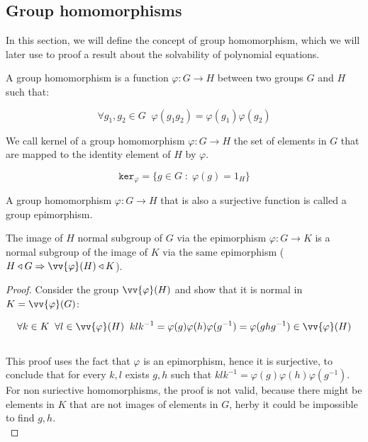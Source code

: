 \subsection{Group homomorphisms}
In this section, we will define the concept of group homomorphism, which we 
will later use to proof a result about the solvability of polynomial equations.  

\begin{definition}
    A group homomorphism is a function $\varphi: G \to H$ between 
    two groups $G$ and $H$ such that:
    
    $$ \forall g_1, g_2 \in G\;\; \varphi(g_1g_2) = \varphi(g_1)\varphi(g_2) $$
\end{definition} \vspace{0.2em}

\begin{definition}[Kernel]
    We call kernel of a group homomorphism $\varphi: G \to H$ the set of
    elements in $G$ that are mapped to the identity element of $H$ by $\varphi$.

    $$ \texttt{ker}_{\varphi} = \{ g \in G \;:\; \varphi(g) = 1_H \}$$
\end{definition} \vspace{0.2em}

\begin{definition}
    A group homomorphism $\varphi: G \to H$ that is also a surjective 
    function is called a group epimorphism.
\end{definition} \vspace{0.2em}

\begin{lemma}
\label{lem:epimorphismPreservesNormality}
    The image of $H$ normal subgroup of $G$ via the epimorphism $\varphi: G \to K$
    is a normal subgroup of the image of $K$ via the same epimorphism 
    ($H \triangleleft G \Rightarrow \vv{\varphi}(H) \triangleleft K$). 
\end{lemma}
\begin{proof}
    Consider the group $\vv{\varphi}(H)$ and show that it is normal in $K = \vv{\varphi}(G)$:

    $$ \forall k \in K\;\; \forall l \in \vv{\varphi}(H)\;\; klk^{-1} = 
        \varphi(g)\varphi(h)\varphi(g^{-1}) = \varphi(ghg^{-1}) \in \vv{\varphi}(H) $$ \\

    This proof uses the fact that $\varphi$ is an epimorphism, hence it is surjective, to 
    conclude that for every $k,l$ exists $g, h$ such that $klk^{-1} = \varphi(g)\varphi(h)
    \varphi(g^{-1})$. For non suriective homomorphisms, the proof is not valid, because 
    there might be elements in $K$ that are not images of elements in $G$, herby 
    it could be impossible to find $g,h$. \\
\end{proof} \vspace{0.2em}

